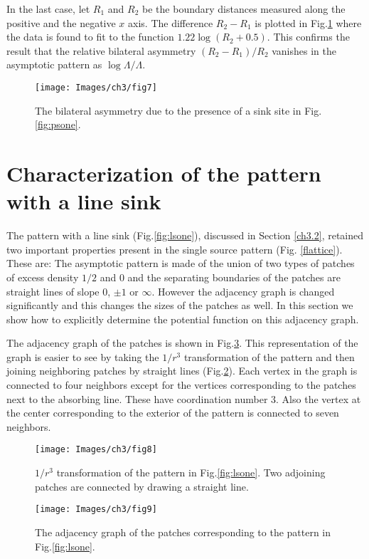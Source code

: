 \documentclass[11pt,a4paper]{book}
\begin{document}
In the last case, let $R_{1}$ and $R_{2}$ be the boundary distances measured along the
positive and the negative $x$ axis. The difference $R_{2}-R_{1}$ is plotted in 
Fig.\ref{fig:asymmetry} where the data is found to fit to the
function $1.22\log{(R_{2}+0.5)}$. This confirms the result that the relative
bilateral asymmetry $(R_{2}-R_{1})/R_{2}$ vanishes in the asymptotic pattern as $\log\Lambda/\Lambda$.
\begin{SCfigure}
\texttt{[image: Images/ch3/fig7]}
\caption{The bilateral asymmetry due to the presence of a sink site in Fig.\ref{fig:psone}.}
\label{fig:asymmetry}
\end{SCfigure}



\section{Characterization of the pattern with a line
sink}\label{ch3.5}
The pattern with a line sink (Fig.\ref{fig:lsone}), discussed in
Section \ref{ch3.2}, retained two important properties present in 
the single source pattern (Fig. \ref{flattice}). These are: The asymptotic pattern is made of
the union of two types of patches of excess density $1/2$ and $0$
and the separating boundaries of the patches are straight lines of slope $0$, $\pm1$ or
$\infty$. However the adjacency graph is changed significantly and this changes the sizes
of the patches as well. In this section we show how to explicitly determine the potential
function on this adjacency graph.

The adjacency graph of the patches is shown in Fig.\ref{fig:adjLS}. 
This representation of the graph is easier to see by taking the $1/r^{3}$
transformation of the pattern and then joining neighboring patches by straight lines (Fig.\ref{fig:1byrsqr}).
Each vertex in the graph is connected to four neighbors except for the vertices corresponding to
the patches next to the absorbing line. These have coordination number $3$. Also the vertex
at the center corresponding to the exterior of the pattern is connected to seven neighbors.
\begin{figure}[t]
\begin{center}
\texttt{[image: Images/ch3/fig8]}
\caption{ $1/r^{3}$ transformation of the pattern in Fig.\ref{fig:lsone}. Two adjoining patches are connected by drawing a straight line.}
\label{fig:1byrsqr}
\end{center}
\end{figure}
\begin{figure}
\begin{center}
\texttt{[image: Images/ch3/fig9]}
\caption{ The adjacency graph of the patches corresponding to the pattern in Fig.\ref{fig:lsone}.}
\label{fig:adjLS}
\end{center}
\end{figure}
\end{document}
